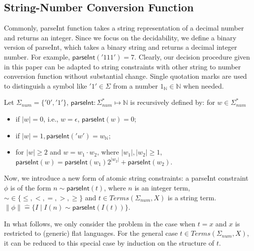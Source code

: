 \documentclass[runningheads]{llncs}
\newcommand{\parseInt}{\textsf{parseInt}}
\newcommand{\Def}{\hat{=}}
\begin{document}
\subsection{String-Number Conversion Function}

Commonly, 
{\parseInt} function takes a string representation of a decimal
number and returns an integer.
Since we focus on the decidability,
we define a binary version of {\parseInt},
which takes a binary string and returns a decimal integer number.
For example,
${\parseInt}('111')=7$. 
Clearly,  our decision procedure given in this paper 
can be adapted to string constraints with other string to number conversion function without substantial change. 
Single quotation marks are used to distinguish a symbol like $'1'\in \Sigma$
from a number $1_\mathbb{N}\in \mathbb{N}$ when needed.


\begin{definition} Let $\Sigma_{\textit{num}}=\{'0','1'\}$,
 ${\parseInt}:\Sigma_{\textit{num}}^*\mapsto \mathbb{N}$ is recursively defined by:
    for $w\in \Sigma_{\textit{num}}^*$
    \begin{itemize}
        \item if $|w|=0$, i.e., $w=\epsilon$,  ${\parseInt}(w)=0$;
        \item if $|w|=1, {\parseInt}('w')=w_\mathbb{N}$;
        \item for $|w|\ge 2$ and $w=w_1 \cdot w_2$, 
        where $|w_1|, |w_2| \ge 1$, 
        ${\parseInt}(w) = {\parseInt}(w_1)2^{|w_2|}+{\parseInt}(w_2)$.
    \end{itemize} 
\end{definition}

Now, we introduce a new form of atomic string constraints: 
a {\parseInt} constraint $\phi$ is of the form 
$n \sim {\parseInt}(t)$,
where $n$ is an integer term, $\sim \in \{\le,<,=,>,\ge\}$ and $t\in \textit{Terms}(\Sigma_{\textit{num}},X)$ is a string term.
$\lVert \phi\rVert \Def  \{I \mid I(n)\sim {\parseInt}(I(t))\}$.

In what follows, we only  consider the problem in the case when $t=x$ and $x$ is restricted to (generic) flat languages. 
For the general case $t\in \textit{Terms}(\Sigma_{\textit{num}},X)$, 
it can be reduced to this special case by induction on the structure of $t$. 
\end{document}
